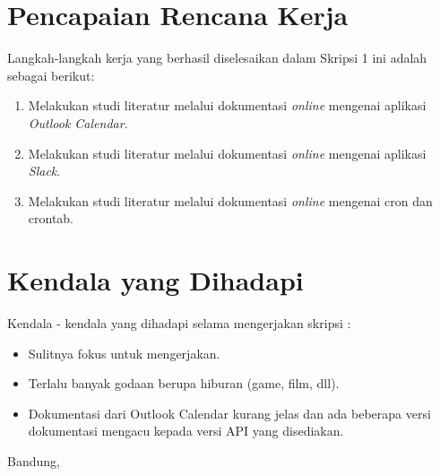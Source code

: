 \documentclass[a4paper,twoside]{article}
\begin{document}
\section{Pencapaian Rencana Kerja}
Langkah-langkah kerja yang berhasil diselesaikan dalam Skripsi 1 ini adalah sebagai berikut:
\begin{enumerate}
\item Melakukan studi literatur melalui dokumentasi \textit{online} mengenai aplikasi \textit{Outlook Calendar}.
\item Melakukan studi literatur melalui dokumentasi \textit{online} mengenai aplikasi \textit{Slack}.
\item Melakukan studi literatur melalui dokumentasi \textit{online} mengenai cron dan crontab. 
\end{enumerate}



\section{Kendala yang Dihadapi}
Kendala - kendala yang dihadapi selama mengerjakan skripsi :
\begin{itemize}
	\item Sulitnya fokus untuk mengerjakan. 
	\item Terlalu banyak godaan berupa hiburan (game, film, dll). 
	\item Dokumentasi dari Outlook Calendar kurang jelas dan ada beberapa versi dokumentasi mengacu kepada versi API yang disediakan.
\end{itemize}

\vspace{1cm}
\centering Bandung, \tanggal\\
\vspace{2cm} \nama \\ 
\vspace{1cm}
\end{document}
